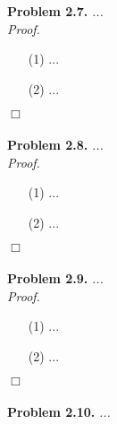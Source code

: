 \documentclass{article}
\begin{document}



\textbf{Problem 2.7.}
\emph{...} \\



\emph{Proof.}
\begin{enumerate}
\item[(1)]
  ...

\item[(2)]
  ...
\end{enumerate}
$\Box$ \\\\






\textbf{Problem 2.8.}
\emph{...} \\



\emph{Proof.}
\begin{enumerate}
\item[(1)]
  ...

\item[(2)]
  ...
\end{enumerate}
$\Box$ \\\\






\textbf{Problem 2.9.}
\emph{...} \\



\emph{Proof.}
\begin{enumerate}
\item[(1)]
  ...

\item[(2)]
  ...
\end{enumerate}
$\Box$ \\\\






\textbf{Problem 2.10.}
\emph{...} \\
\end{document}
